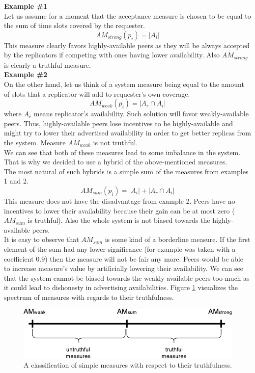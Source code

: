 \documentclass{pracamgren}
\begin{document}
{\bf Example \#1}\\
Let us assume for a moment that the acceptance measure is chosen to be equal to the sum of time slots covered by the requester.
$$AM_{strong}(p_i) = |A_i|$$
This measure clearly favors highly-available peers as they will be always accepted by the replicators if competing with ones having lower availability. Also $AM_{strong}$ is clearly a truthful measure.\\

{\bf Example \#2}\\
On the other hand, let us think of a system measure being equal to the amount of slots that a replicator will add to requester's own coverage.
$$AM_{weak}(p_i) = |A_r \cap A_i|$$
where $A_r$ means replicator's availability.
Such solution will favor weakly-available peers. Thus, highly-available peers lose incentives to be highly-available and might try to lower their advertised availability in order to get better replicas from the system. Measure $AM_{weak}$ is not truthful.\\

We can see that both of these measures lead to some imbalance in the system. That is why we decided to use a hybrid of the above-mentioned measures.\\

The most natural of such hybrids is a simple sum of the measures from examples 1 and 2.
$$AM_{sum}(p_i) = |A_i| + |A_r \cap A_i|$$
This measure does not have the disadvantage from example 2. Peers have no incentives to lower their availability because their gain can be at most zero ($AM_{sum}$ is truthful). Also the whole system is not biased towards the highly-available peers.\\

It is easy to observe that $AM_{sum}$ is some kind of a borderline measure. If the first element of the sum had any lower significance (for example was taken with a coefficient $0.9$) then the measure will not be fair any more. Peers would be able to increase measure's value by artificially lowering their availability. We can see that the system cannot be biased towards the weakly-available peers too much as it could lead to dishonesty in advertising availabilities. Figure \ref{fig:measures} visualizes the spectrum of measures with regards to their truthfulness.\\

\begin{figure}[h]
\centering
\includegraphics{measures.pdf}
\caption{A classification of simple measures with respect to their truthfulness.}
\label{fig:measures}
\end{figure}
\end{document}
